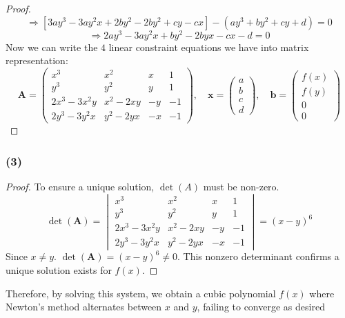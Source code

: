 \documentclass{article}
\begin{document}
\begin{proof}
    \[ \Rightarrow [3ay^3 - 3ay^2x + 2by^2 - 2by^2 + cy - cx] - (ay^3 + by^2 + cy + d) = 0 \]
    \[ \Rightarrow 2ay^3 - 3ay^2x + by^2 - 2byx - cx - d = 0 \]
    Now we can write the $4$ linear constraint equations we have into matrix representation:
    \[
        \mathbf{A} = \begin{pmatrix}
            x^3 & x^2 & x & 1 \\
            y^3 & y^2 & y & 1 \\
            2x^3 - 3x^2y & x^2 - 2xy & -y & -1 \\
            2y^3 - 3y^2x & y^2 - 2yx & -x & -1
        \end{pmatrix},
        \quad
        \mathbf{x} = \begin{pmatrix}
            a \\
            b \\
            c \\
            d
        \end{pmatrix},
        \quad
        \mathbf{b} = \begin{pmatrix}
            f(x) \\
            f(y) \\
            0 \\
            0
        \end{pmatrix}
    \]
\end{proof}

\subsubsection*{(3)}
\begin{proof}
    To ensure a unique solution, $\det(A)$ must be non-zero.
    \[
        \det(\mathbf{A}) = \begin{vmatrix}
            x^3 & x^2 & x & 1 \\
            y^3 & y^2 & y & 1 \\
            2x^3 - 3x^2y & x^2 - 2xy & -y & -1 \\
            2y^3 - 3y^2x & y^2 - 2yx & -x & -1
        \end{vmatrix} = (x - y)^6
    \]
    Since $x \neq y$. \( \det(\mathbf{A}) = (x - y)^6 \neq 0 \). This nonzero determinant confirms a unique solution exists for $f(x)$.
\end{proof}
\noindent Therefore, by solving this system, we obtain a cubic polynomial $f(x)$ where Newton's method alternates between $x$ and $y$, failing to converge as desired
\end{document}
